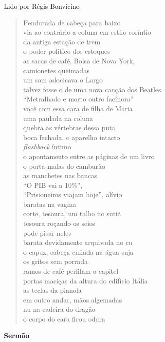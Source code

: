 Lido por Régis Bonvicino

\begin{verse}
Pendurada de cabeça para baixo\\
via ao contrário a coluna em estilo coríntio\\
da antiga estação de trem\\
o poder político dos estoques\\[5pt]
as sacas de café, Bolsa de Nova York,\\
camionetes queimadas\\
um som adocicava o Largo\\
talvez fosse o de uma nova canção dos Beatles\\[5pt]
``Metralhado e morto outro facínora''\\
você com essa cara de filha de Maria\\
uma paulada na coluna\\
quebra as vértebras dessa puta\\[5pt]
boca fechada, o aparelho intacto\\
\emph{flashback} íntimo\\
o apontamento entre as páginas de um livro\\
o porta-malas do camburão\\[5pt]
as manchetes nas bancas\\
``O PIB vai a 10\%'',\\
``Prisioneiros viajam hoje'', alívio\\
baratas na vagina\\[5pt]
corte, tesoura, um talho no sutiã\\
tesoura roçando os seios\\
pode pisar neles\\
barata devidamente arquivada no cu\\[5pt]
o capuz, cabeça enfiada na água suja\\
os gritos sem porrada\\
ramos de café perfilam o capitel\\
portas maciças da altura do edifício Itália\\[5pt]
as teclas da pianola\\
em outro andar, mãos algemadas\\
nu na cadeira do dragão\\
o corpo do cara ficou odara
\end{verse}

\pagebreak

\textbf{Sermão}

